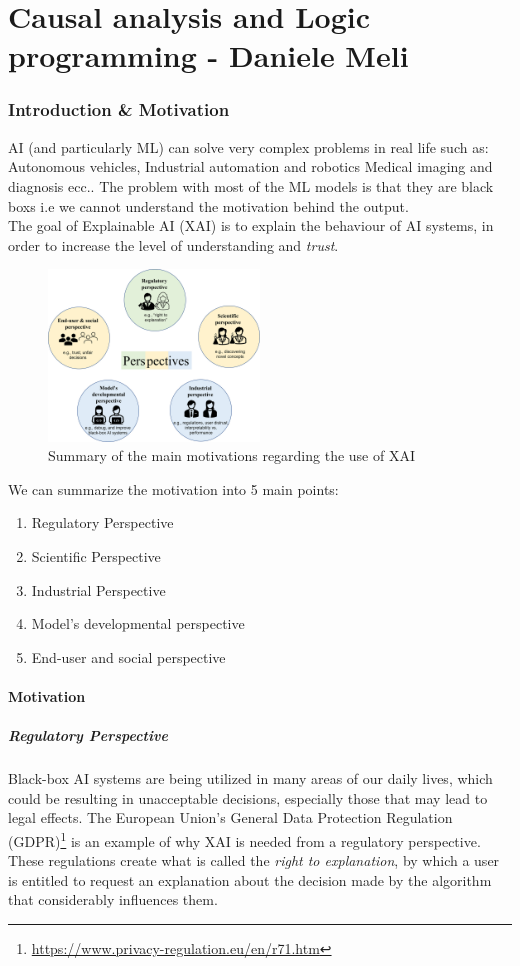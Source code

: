 \part{Causal analysis and Logic programming - Daniele Meli}
\section{Introduction \& Motivation}
AI (and particularly ML) can solve very complex problems in real life such as: Autonomous vehicles, Industrial automation and robotics Medical imaging and diagnosis ecc..
The problem with most of the ML models is that they are black boxs i.e we cannot understand the motivation behind the output.\\

The goal of Explainable AI (XAI) is to explain the behaviour of AI systems, in order to increase the
level of understanding and \emph{trust}. 
\begin{figure}[H]
    \includegraphics[width=0.5\textwidth]{img/motivation.jpg}
    \centering
    \caption{Summary of the main motivations regarding the use of XAI}
\end{figure}
We can summarize the motivation into 5 main points:
\begin{enumerate}
    \item Regulatory Perspective
    \item Scientific Perspective
    \item Industrial Perspective
    \item Model's developmental perspective
    \item End-user and social perspective
\end{enumerate}
\subsection{Motivation}
\subsubsection*{Regulatory Perspective}
Black-box AI systems are being utilized in many areas of our daily lives, which could be resulting in unacceptable decisions, especially those that may lead to legal effects. 
The European Union's General Data Protection Regulation (GDPR)\footnote{\url{https://www.privacy-regulation.eu/en/r71.htm}} is an example of why XAI is needed from a regulatory perspective. 
These regulations create what is called the \emph{right to explanation}, by which a user is entitled to request an explanation about the decision made by the algorithm that considerably influences them.

